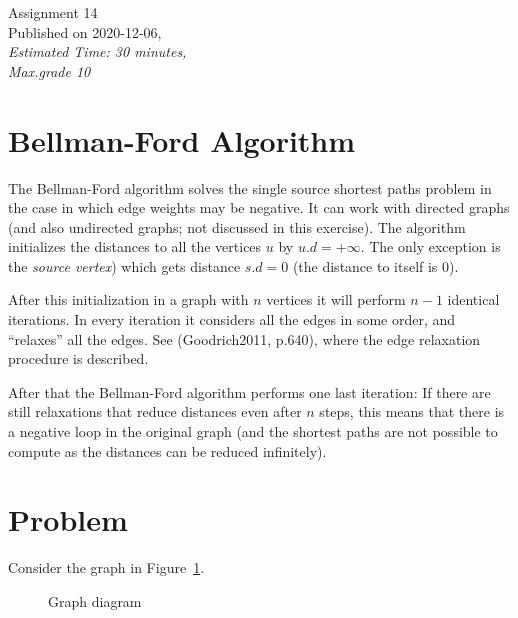 \documentclass[a4paper,12pt]{article}
\begin{document}
\twocolumn

\thispagestyle{empty}

\begin{center}
{\Large Assignment 14}\\
{\Large Published on 2020-12-06,}\\
{\em Estimated Time: 30 minutes,}\\
{\em Max.grade 10\textperthousand} 
\end{center}


\section{Bellman-Ford Algorithm}

The Bellman-Ford algorithm solves the single source shortest paths problem in
the case in which edge weights may be negative. It can work with directed graphs
(and also undirected graphs; not discussed in this exercise).  
The algorithm initializes the distances to all the vertices $u$ by $u.d = +\infty$. 
The only exception is the {\em source vertex}) which 
gets distance $s.d = 0$ (the distance to itself is $0$). 

After this initialization 
in a graph with $n$ vertices it will perform $n-1$ identical iterations. 
In every iteration it considers all the edges in some order, 
and ``relaxes'' all the edges. See (Goodrich2011, p.640), where
the edge relaxation procedure is described. 

After that the Bellman-Ford algorithm performs one last iteration: 
If there are still relaxations that reduce distances even after $n$ steps, 
this means that there is a negative loop in the original graph 
(and the shortest paths are not possible to compute as the distances can 
be reduced infinitely). 



\section{Problem}

Consider the graph in Figure~\ref{fig:problem-graph}.

\begin{figure}[!htb]
\caption{\label{fig:problem-graph} Graph diagram}
\end{figure}
\end{document}
